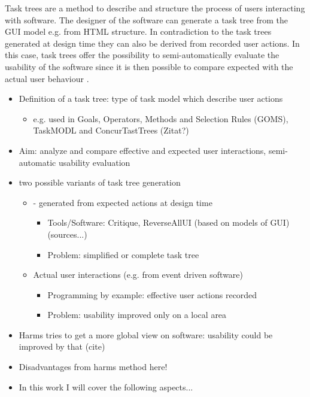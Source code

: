 Task trees are a method to describe and structure the process of users interacting with software. 
The designer of the software can generate a task tree from the GUI model e.g. from HTML structure. In contradiction to the task trees generated at design time they can also be derived from recorded user actions. In this case, task trees offer the possibility to semi-automatically evaluate the usability of the software since it is then possible to compare expected with the actual user behaviour \citep{harms2013}.  

\begin{itemize}
	\item Definition of a task tree: type of task model which describe user actions
    	\begin{itemize}
		\item  e.g. used in Goals, Operators, Methods and Selection Rules (GOMS), TaskMODL and ConcurTastTrees (Zitat?)
	\end{itemize}
	\item Aim: analyze and compare effective and expected user interactions, semi-automatic usability evaluation
	\item two possible variants of task tree generation 
 	\begin{itemize}
		\item - generated from expected actions at design time
      		\begin{itemize}
			\item Tools/Software: Critique, ReverseAllUI (based on models of GUI) (sources...)
     			\item Problem: simplified or complete task tree
		\end{itemize}
		\item Actual user interactions (e.g. from event driven software)
     		\begin{itemize} 
			\item Programming by example: effective user actions recorded
			\item Problem: usability improved only on a local area
		\end{itemize}
	\end{itemize}
	\item Harms tries to get a more global view on software: usability could be improved by that (cite) 
	\item Disadvantages from harms method here!
	\item In this work I will cover the following aspects...
\end{itemize}


